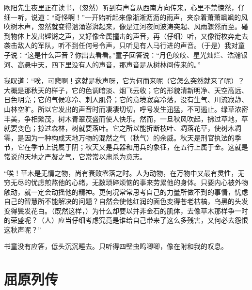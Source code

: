 \documentclass[12pt,UTF-8,openany]{ctexbook}
\begin{document}
\begin{normalsize}
    
    欧阳先生夜里正在读书，（忽然）听到有声音从西南方向传来，心里不禁悚然，仔细一听，说道：“奇怪啊！”一开始听起来像淅淅沥沥的雨声，夹杂着萧萧飒飒的风吹树木声，忽然就变得汹涌澎湃起来，像是江河夜间波涛突起、风雨骤然而至。碰到物体上发出铿锵之声，又好像金属撞击的声音，再（仔细）听，又像衔枚奔走去袭击敌人的军队，听不到任何号令声，只听见有人马行进的声音。（于是）我对童子说：“这是什么声音？你出去看看。”童子回答说：“月色皎皎、星光灿烂、浩瀚银河、高悬中天，四下里没有人的声音，那声音是从树林间传来的。”
    
    我叹道：“唉，可悲啊！这就是秋声呀，它为何而来呢（它怎么突然就来了呢）？大概是那秋天的样子，它的色调暗淡、烟飞云收；它的形貌清新明净、天空高远、日色明亮；它的气候寒冷、刺人肌骨；它的意境寂寞冷落，没有生气、川流寂静、山林空旷。所以它发出的声音时而凄凄切切，呼号发生迅猛，不可遏止。绿草浓密丰美，争相繁茂，树木青翠茂盛而使人快乐。然而，一旦秋风吹起，拂过草地，草就要变色；掠过森林，树就要落叶。它之所以能折断枝叶、凋落花草，使树木凋零，是因为一种构成天地万物的混然之气（秋气）的余威。秋天是刑官执法的季节，它在季节上说属于阴；秋天又是兵器和用兵的象征，在五行上属于金。这就是常说的天地之严凝之气，它常常以肃杀为意志。
    
    “唉！草木是无情之物，尚有衰败零落之时。人为动物，在万物中又最有灵性，无穷无尽的忧虑煎熬他的心绪，无数琐碎烦恼的事来劳累他的身体。只要内心被外物触动，就一定会动摇他的精神。更何况常常思考自己的力量所做不到的事情，忧虑自己的智慧所不能解决的问题？自然会使他红润的面色变得苍老枯槁，乌黑的头发变得鬓发花白。（既然这样，）为什么却要以并非金石的肌体，去像草木那样争一时的荣盛呢？（人）应当仔细考虑究竟是谁给自己带来了这么多残害，又何必去怨恨这秋声呢？”
    
    书童没有应答，低头沉沉睡去。只听得四壁虫鸣唧唧，像在附和我的叹息。
    
\end{normalsize}



\chapter{屈原列传}
\end{document}
